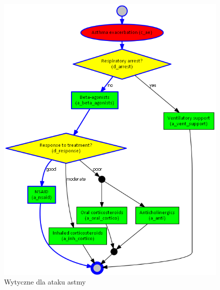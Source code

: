 \begin{figure}[H]
\centering
\includegraphics[scale=0.5]{img/asthma.png}
\caption{Wytyczne dla ataku astmy}
\label{fig:ag_ae}
\end{figure}

